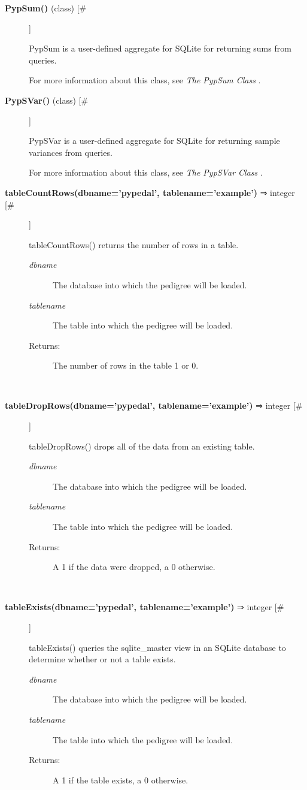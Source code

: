 \begin{description}
\item[\textbf{PypSum()}
 (class) [\#]]

 PypSum is a user-defined aggregate for SQLite for returning sums from queries.


 For more information about this class, see \emph{The PypSum Class}
.

\item[\textbf{PypSVar()}
 (class) [\#]]

 PypSVar is a user-defined aggregate for SQLite for returning sample variances from queries.


 For more information about this class, see \emph{The PypSVar Class}
.

\item[\textbf{tableCountRows(dbname='pypedal', tablename='example')}
 ⇒ integer [\#]]

 tableCountRows() returns the number of rows in a table.
\begin{description}
\item[\emph{dbname}
] The database into which the pedigree will be loaded.
\item[\emph{tablename}
] The table into which the pedigree will be loaded.
\item[Returns:] The number of rows in the table 1 or 0.

\end{description}
\\ 

\item[\textbf{tableDropRows(dbname='pypedal', tablename='example')}
 ⇒ integer [\#]]

 tableDropRows() drops all of the data from an existing table.
\begin{description}
\item[\emph{dbname}
] The database into which the pedigree will be loaded.
\item[\emph{tablename}
] The table into which the pedigree will be loaded.
\item[Returns:] A 1 if the data were dropped, a 0 otherwise.

\end{description}
\\ 

\item[\textbf{tableExists(dbname='pypedal', tablename='example')}
 ⇒ integer [\#]]

 tableExists() queries the sqlite\_master view in an SQLite database to determine whether or not a table exists.
\begin{description}
\item[\emph{dbname}
] The database into which the pedigree will be loaded.
\item[\emph{tablename}
] The table into which the pedigree will be loaded.
\item[Returns:] A 1 if the table exists, a 0 otherwise.

\end{description}
\\ 


\end{description}
